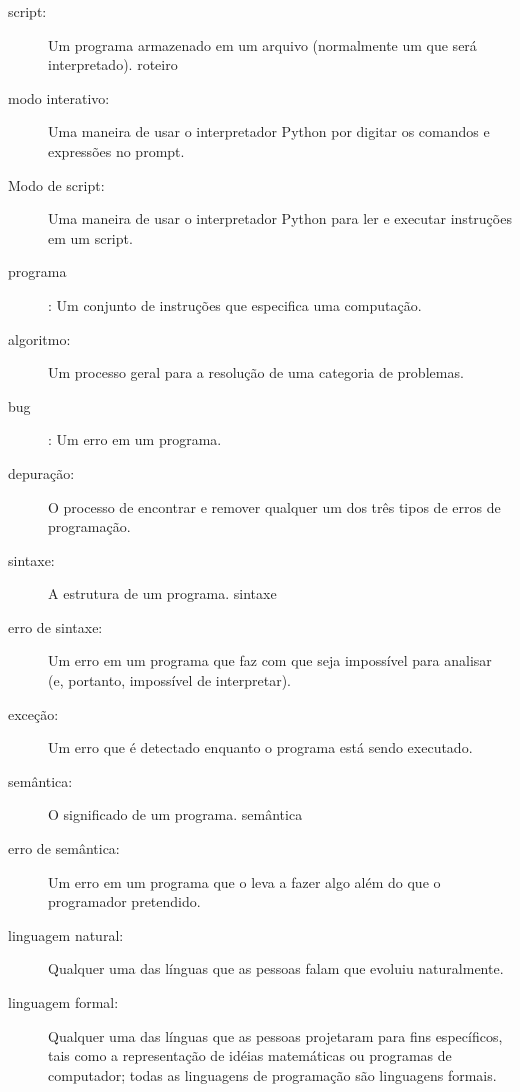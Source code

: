 \documentclass[10pt]{book}
\begin{document}
\begin{description}
\item[script:] Um programa armazenado em um arquivo (normalmente um que será
interpretado).
\index{} roteiro

\item[modo interativo:] Uma maneira de usar o interpretador Python por
digitar os comandos e expressões no prompt.

\item[Modo de script:] Uma maneira de usar o interpretador Python para ler
e executar instruções em um script.

\item[programa]: Um conjunto de instruções que especifica uma computação.

\item[algoritmo:] Um processo geral para a resolução de uma categoria de
problemas.

\item[bug]: Um erro em um programa.

\item[depuração:] O processo de encontrar e remover qualquer um dos
três tipos de erros de programação.

\item[sintaxe:] A estrutura de um programa.
\index{} sintaxe

\item[erro de sintaxe:] Um erro em um programa que faz com que seja impossível
para analisar (e, portanto, impossível de interpretar).

\item[exceção:] Um erro que é detectado enquanto o programa está sendo executado.

\item[semântica:] O significado de um programa.
\index{} semântica

\item[erro de semântica:] Um erro em um programa que o leva a fazer algo
além do que o programador pretendido.

\item[linguagem natural:] Qualquer uma das línguas que as pessoas falam que
evoluiu naturalmente.

\item[linguagem formal:] Qualquer uma das línguas que as pessoas projetaram
para fins específicos, tais como a representação de idéias matemáticas ou
programas de computador; todas as linguagens de programação são linguagens formais.


\end{description}
\end{document}
